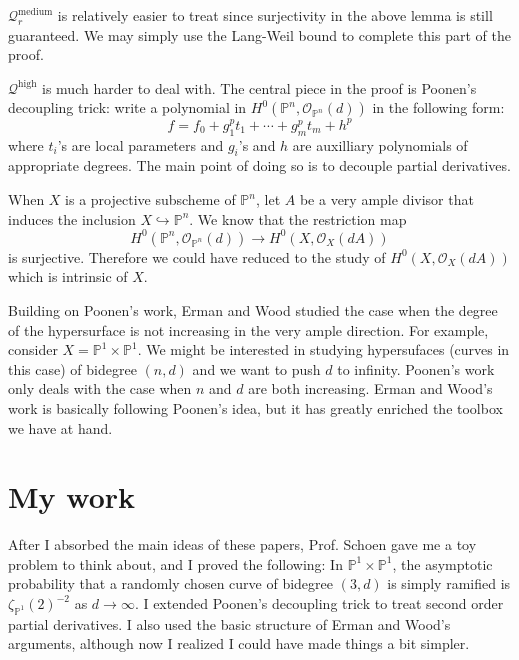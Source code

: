 \documentclass[12pt]{article}
\theoremstyle{plain}
\theoremstyle{definition}
\newcommand{\IP}{\mathbb{P}}
\newcommand{\sO}{\mathcal{O}}
\newcommand{\<}{\langle}
\renewcommand{\>}{\rangle}
\newcommand{\into}{\hookrightarrow}
\newcommand{\Qmed}{\mathcal{Q}_r^\mathrm{medium}}
\newcommand{\Qhigh}{\mathcal{Q}^\mathrm{high}}
\begin{document}
$\Qmed$ is relatively easier to treat since surjectivity in the above lemma is still guaranteed. We may simply use the Lang-Weil bound to complete this part of the proof. 

$\Qhigh$ is much harder to deal with. The central piece in the proof is Poonen's decoupling trick: write a polynomial in $H^0(\IP^n, \sO_{\IP^n}(d))$ in the following form:
$$ f = f_0 + g_1^p t_1 + \cdots + g_m^p t_m + h^p $$ 
where $t_i$'s are local parameters and $g_i$'s and $h$ are auxilliary polynomials of appropriate degrees. The main point of doing so is to decouple partial derivatives. 

When $X$ is a projective subscheme of $\IP^n$, let $A$ be a very ample divisor that induces the inclusion $X \into \IP^n$. We know that the restriction map 
$$ H^0(\IP^n, \sO_{\IP^n}(d)) \to H^0(X, \sO_X(d A)) $$ 
is surjective. Therefore we could have reduced to the study of $H^0(X, \sO_X(d A))$ which is intrinsic of $X$. 

Building on Poonen's work, Erman and Wood studied the case when the degree of the hypersurface is not increasing in the very ample direction. For example, consider $X = \IP^1 \times \IP^1$. We might be interested in studying hypersufaces (curves in this case) of bidegree $(n, d)$ and we want to push $d$ to infinity. Poonen's work only deals with the case when $n$ and $d$ are both increasing. Erman and Wood's work is basically following Poonen's idea, but it has greatly enriched the toolbox we have at hand. 

\section{My work}

After I absorbed the main ideas of these papers, Prof. Schoen gave me a toy problem to think about, and I proved the following: In $\IP^1 \times \IP^1$, the asymptotic probability that a randomly chosen curve of bidegree $(3, d)$ is simply ramified is $\zeta_{\IP^1}(2)^{-2}$ as $d \to \infty$. I extended Poonen's decoupling trick to treat second order partial derivatives. I also used the basic structure of Erman and Wood's arguments, although now I realized I could have made things a bit simpler. 
\end{document}
